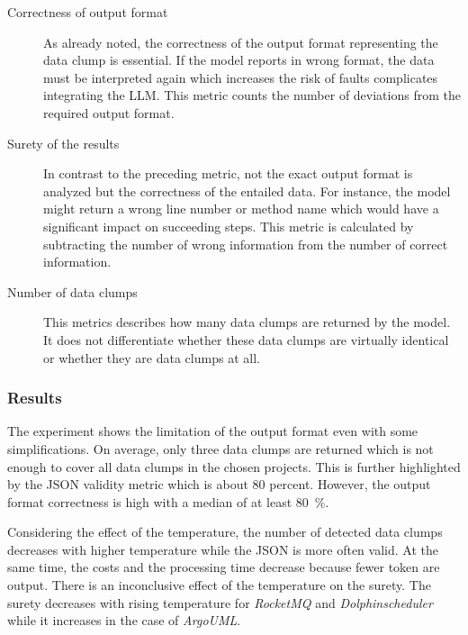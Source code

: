 \begin{description}

    \item[Correctness of output format]
    As already noted, the correctness of the output format representing the data clump is essential. If the model reports in wrong format, the data must be interpreted again which increases the risk of faults complicates integrating the \ac{LLM}. This metric counts the number of deviations from the required output format.

     \item [Surety of the results] In contrast to the preceding metric, not the exact output format is analyzed but the correctness of the entailed data. For instance, the model might return a wrong line number or method name which would have a significant impact on succeeding steps. This metric is calculated by subtracting the number of wrong information from the number of correct information. 

     \item [Number of data clumps] This metrics describes how many data clumps are returned by the model. It does not differentiate whether these data clumps are virtually identical or whether they are data clumps at all. 
     

   

    

   
\end{description}



\subsubsection{Results} 

The experiment shows the limitation of the output format even with some simplifications. On average, only three data clumps are returned which is not enough to cover all data clumps in the chosen projects. This is further highlighted by the \ac{JSON} validity metric which is about 80 percent. However, the output format correctness is high with a median of at least 80~\%. 

Considering the effect of the temperature, the number of detected data clumps decreases with higher temperature while  the \ac{JSON} is more often valid. At the same time, the costs and the processing time decrease because fewer token are output. There is an inconclusive effect of the temperature on the surety. The surety decreases with rising temperature for \textit{RocketMQ} and \textit{Dolphinscheduler} while it increases in the case of \textit{ArgoUML}. 

